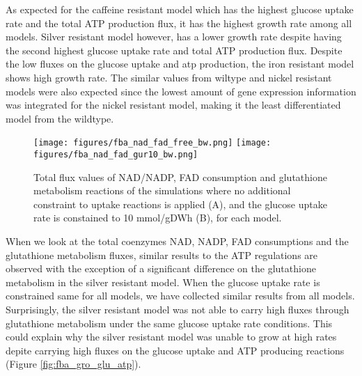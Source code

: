 As expected for the caffeine resistant model which has the highest glucose uptake rate and the total ATP production flux, it has the highest growth rate among all models. Silver resistant model however, has a lower growth rate despite having the second highest glucose uptake rate and total ATP production flux. Despite the low fluxes on the glucose uptake and atp production, the iron resistant model shows high growth rate. The similar values from wiltype and nickel resistant models were also expected since the lowest amount of gene expression information was integrated for the nickel resistant model, making it the least differentiated model from the wildtype.

\begin{figure}[H]
  \begin{center}
  \texttt{[image: figures/fba\_nad\_fad\_free\_bw.png]}
  \baselineskip
  \texttt{[image: figures/fba\_nad\_fad\_gur10\_bw.png]}
  \caption[Total flux values of NAD/NADP, FAD consumption and glutathione metabolism reactions of the simulations where  no additional constraint to uptake reactions is applied (TOP), and the glucose uptake rate is constained to 10 mmol/gDWh (BOTTOM), for each model]{Total flux values of NAD/NADP, FAD consumption and glutathione metabolism reactions of the simulations where  no additional constraint to uptake reactions is applied (A), and the glucose uptake rate is constained to 10 mmol/gDWh (B), for each model.}
  \label{fig:fba_nad_fad}
  \end{center}
\end{figure}

When we look at the total coenzymes NAD, NADP, FAD consumptions and the glutathione metabolism fluxes, similar results to the ATP regulations are observed with the exception of a significant difference on the glutathione metabolism in the silver resistant model. When the glucose uptake rate is constrained same for all models, we have collected similar results from all models. Surprisingly, the silver resistant model was not able to carry high fluxes through glutathione metabolism under the same glucose uptake rate conditions. This could explain why the silver resistant model was unable to grow at high rates depite carrying high fluxes on the glucose uptake and ATP producing reactions (Figure \ref{fig:fba_gro_glu_atp}).


